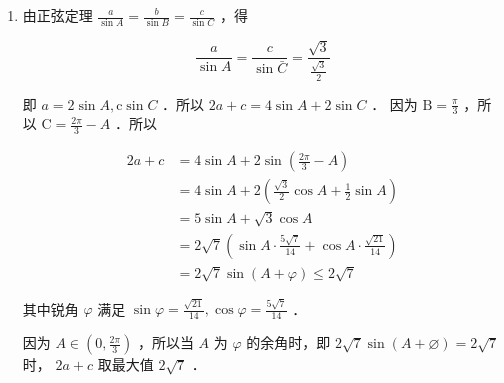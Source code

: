 \begin{enumerate}
\begin{enumerate}
\begin{jieda}
\begin{enumerate}[(1)]
$$
\sqrt{3} \sin B \sin C-\cos B \sin C-\sin C=0
$$

又 $0<C<\pi$ ，所以 $\sin C>0$ ．所以

$$
\sqrt{3} \sin B-\cos B-1=0
$$

$$
2\left(\sin B \cdot \frac{\sqrt{3}}{2}-\cos B \cdot \frac{1}{2}\right)=1
$$

$$
2\left(\sin B \cos \frac{\pi}{6}-\cos B \sin \frac{\pi}{6}\right)=1 \text { 亦即 } 2\sin \left(B-\frac{\pi}{6}\right)=1
$$
又 $0<B<\pi$ ，所以 $B=\frac{\pi}{3}$ ．
又 $\mathrm{A}+\mathrm{B}+\mathrm{C}=\pi$ ，所以 $\mathrm{A}+\mathrm{C}=\frac{2 \pi}{3}=2 B$ ．
所以 $A, ~ B, ~ C$ 成等差数列．

\item 由正弦定理 $\frac{a}{\sin A}=\frac{b}{\sin B}=\frac{c}{\sin C}$ ，得

$$
\frac{a}{\sin A}=\frac{c}{\sin \bar{C}}=\frac{\sqrt{3}}{\frac{\sqrt{3}}{2}}
$$


即 $a=2 \sin A, \mathrm{c} \sin C$ ．所以 $2 a+c=4 \sin A+2 \sin C$ ．
因为 $\mathrm{B}=\frac{\pi}{3}$ ，所以 $\mathrm{C}=\frac{2 \pi}{3}-A$ ．所以

$$
\begin{aligned}
2 a+c&=4 \sin A+2 \sin \left(\frac{2 \pi}{3}-A\right) \\
& =4 \sin A+2\left(\frac{\sqrt{3}}{2} \cos A+\frac{1}{2} \sin A\right) \\
& =5 \sin A+\sqrt{3} \cos A \\
&=2 \sqrt{7}\left(\sin A \cdot \frac{5 \sqrt{7}}{14}+\cos A \cdot \frac{\sqrt{21}}{14}\right) \\
& =2 \sqrt{7} \sin (A+\varphi) \leq 2 \sqrt{7}
\end{aligned}
$$


其中锐角 $\varphi$ 满足 $\sin \varphi=\frac{\sqrt{21}}{14}, \cos \varphi=\frac{5 \sqrt{7}}{14}$ ．

因为 $A \in\left(0, \frac{2 \pi}{3}\right)$ ，所以当 $A$ 为 $\varphi$ 的余角时，即 $2 \sqrt{7} \sin (A+\varnothing)=2 \sqrt{7}$ 时， $2 a+c$ 取最大值 $2 \sqrt{7}$ ．
    \end{enumerate}
\end{jieda}
\end{enumerate}\end{enumerate}